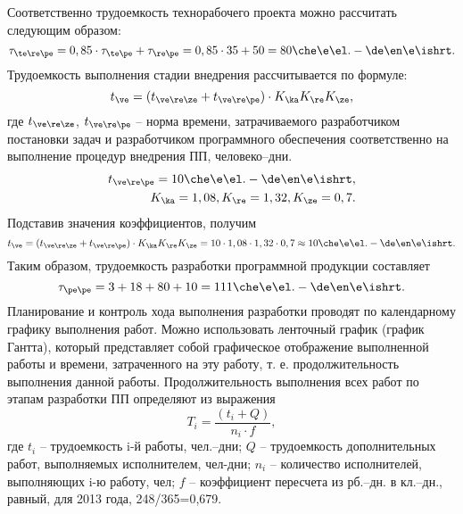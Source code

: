 Соответственно трудоемкость технорабочего проекта можно рассчитать следующим образом:
\begin{equation*}
	\tau_{\te\re\pe}=0,85 \cdot \tau_{\te\pe} + \tau_{\re\pe} = 0,85 \cdot 35 + 50 = 80 \che\e\el.-\de\en\e\ishrt.
\end{equation*}
Трудоемкость выполнения стадии внедрения рассчитывается по формуле:
\begin{equation*}
	t_{\ve} = (t_{\ve\re\ze} + t_{\ve\re\pe}) \cdot K_{\ka} K_{\re} K_{\ze},
\end{equation*}
где $t_{\ve\re\ze}$, $t_{\ve\re\pe}$ -- норма времени, затрачиваемого разработчиком постановки задач и разработчиком программного обеспечения соответственно на выполнение процедур внедрения ПП, человеко–дни. 
\begin{eqnarray*}
	t_{\ve\re\pe} = 10 \che\e\el.-\de\en\e\ishrt, \\
	K_{\ka} = 1,08, K_{\re} = 1,32, K_{\ze} = 0,7.
\end{eqnarray*}
Подставив значения коэффициентов, получим
\begin{equation*}
	t_{\ve} = (t_{\ve\re\ze} + t_{\ve\re\pe}) \cdot K_{\ka} K_{\re} K_{\ze} = 10\cdot1,08\cdot1,32\cdot0,7 \approx 10 \che\e\el.-\de\en\e\ishrt.
\end{equation*}
Таким образом, трудоемкость разработки программной продукции   составляет
\begin{equation*}
	\tau_{\pe\pe} = 3 + 18 + 80 + 10 = 111 \che\e\el.-\de\en\e\ishrt.
\end{equation*}
Планирование и контроль хода выполнения разработки проводят по календарному графику выполнения работ. Можно использовать ленточный график (график Гантта), который представляет собой графическое отображение выполненной работы и времени, затраченного на эту работу, т. е. продолжительность выполнения данной работы.
Продолжительность выполнения всех работ по этапам разработки ПП определяют из выражения
\begin{equation*}
	T_i = \frac{(t_i + Q)}{n_i \cdot f},
\end{equation*}
где $t_i$ -- трудоемкость i-й работы, чел.–дни; 
$Q$ -- трудоемкость дополнительных работ, выполняемых исполнителем, чел-дни; 
$n_i$ -- количество исполнителей, выполняющих i-ю работу, чел;
$f$ -- коэффициент пересчета из рб.–дн. в кл.–дн., равный, для 2013 года, 248/365=0,679.

